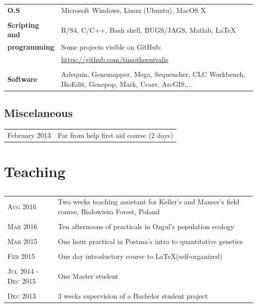 \documentclass[a4paper,10pt]{article} %
\begin{document}
\begin{tabular}{p{4cm}|p{11cm}}
\hfill \textbf{O.S} & Microsoft Windows, Linux (Ubuntu), MacOS X\\
\multicolumn{2}{c}{} \\
\hfill \textbf{Scripting and} & R/S4, C/C++, Bash shell, BUGS/JAGS, Matlab, \LaTeX\\
\hfill \textbf{programming} & Some projects visible on GitHub: \\
										& \url{https://github.com/timotheenivalis}\\
\multicolumn{2}{c}{} \\
\hfill \textbf{Software} & Arlequin, Genemapper, Mega, Sequencher, CLC Workbench, BioEdit, Genepop, Mark, Ucare, ArcGIS,...\\
\end{tabular}

\subsection*{Miscelaneous}
\begin{tabular}{p{4cm}|p{11cm}}
\hfill February 2013 & Far from help first aid course (2 days)\\
\end{tabular}
\section*{Teaching}
\subsection*{}
\begin{tabular}{p{4cm}|p{11cm}}
\hfill \textsc{Aug 2016} & Two weeks teaching assistant for Keller's and Manser's field course, Bia{\l}owie$\dot{\mathrm{z}}$a Forest, Poland\\
\multicolumn{2}{c}{} \\
\hfill \textsc{Mar 2016} & Ten afternoons of practicals in Ozgul's population ecology \\
\multicolumn{2}{c}{} \\
\hfill \textsc{Mar 2015} & One hour practical in Postma's intro to quantitative genetics\\
\multicolumn{2}{c}{} \\
\hfill \textsc{Feb 2015} & One day introductory course to \LaTeX (self-organized)\\
\multicolumn{2}{c}{} \\
\hfill \textsc{Jul 2014 - Dec 2015} & One Master student\\
\multicolumn{2}{c}{} \\
\hfill \textsc{Dec 2013} & 3 weeks supervision of a Bachelor student project\\
\end{tabular}
\end{document}
